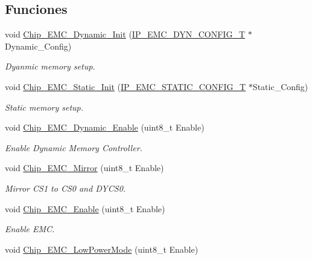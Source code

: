 \subsection*{Funciones}
\begin{DoxyCompactItemize}
\item 
void \hyperlink{group___e_m_c__18_x_x__43_x_x_ga8d91e59911be4b9c0f9de5ea24ac54bb}{Chip\+\_\+\+E\+M\+C\+\_\+\+Dynamic\+\_\+\+Init} (\hyperlink{struct_i_p___e_m_c___d_y_n___c_o_n_f_i_g___t}{I\+P\+\_\+\+E\+M\+C\+\_\+\+D\+Y\+N\+\_\+\+C\+O\+N\+F\+I\+G\+\_\+T} $\ast$Dynamic\+\_\+\+Config)
\begin{DoxyCompactList}\small\item\em Dyanmic memory setup. \end{DoxyCompactList}\item 
void \hyperlink{group___e_m_c__18_x_x__43_x_x_ga32ea97990abe55ab52630f80f5354f82}{Chip\+\_\+\+E\+M\+C\+\_\+\+Static\+\_\+\+Init} (\hyperlink{struct_i_p___e_m_c___s_t_a_t_i_c___c_o_n_f_i_g___t}{I\+P\+\_\+\+E\+M\+C\+\_\+\+S\+T\+A\+T\+I\+C\+\_\+\+C\+O\+N\+F\+I\+G\+\_\+T} $\ast$Static\+\_\+\+Config)
\begin{DoxyCompactList}\small\item\em Static memory setup. \end{DoxyCompactList}\item 
void \hyperlink{group___e_m_c__18_x_x__43_x_x_ga321df7291fbf8c56ec0458b50cfa8f33}{Chip\+\_\+\+E\+M\+C\+\_\+\+Dynamic\+\_\+\+Enable} (uint8\+\_\+t Enable)
\begin{DoxyCompactList}\small\item\em Enable Dynamic Memory Controller. \end{DoxyCompactList}\item 
void \hyperlink{group___e_m_c__18_x_x__43_x_x_gaaa94b20dd9a20de6f6cf07c29d21a3f8}{Chip\+\_\+\+E\+M\+C\+\_\+\+Mirror} (uint8\+\_\+t Enable)
\begin{DoxyCompactList}\small\item\em Mirror C\+S1 to C\+S0 and D\+Y\+C\+S0. \end{DoxyCompactList}\item 
void \hyperlink{group___e_m_c__18_x_x__43_x_x_ga4d9286ae1156d93abdabdb3a0e22ba01}{Chip\+\_\+\+E\+M\+C\+\_\+\+Enable} (uint8\+\_\+t Enable)
\begin{DoxyCompactList}\small\item\em Enable E\+MC. \end{DoxyCompactList}\item 
void \hyperlink{group___e_m_c__18_x_x__43_x_x_ga3b8e25a7ed207f79039ea5929dd6a5ab}{Chip\+\_\+\+E\+M\+C\+\_\+\+Low\+Power\+Mode} (uint8\+\_\+t Enable)

\end{DoxyCompactItemize}

